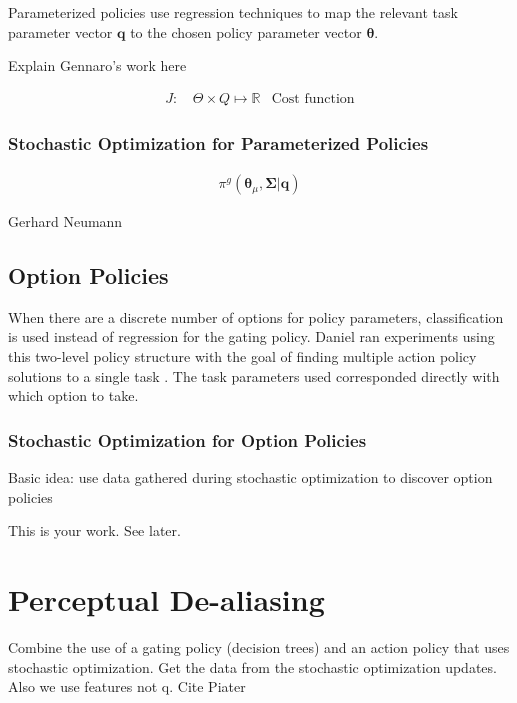 \documentclass[12pt]{article}
\newcommand{\polg}   {\ensuremath{\pi^g}}
\newcommand{\appsp}  {\ensuremath{\Theta}}
\newcommand{\taskp}  {\ensuremath{\mathbf{q}}}
\newcommand{\costf}  {\ensuremath{J}}
\newcommand{\app}    {\ensuremath{\bm{\theta}}}
\newcommand{\taskpsp}{\ensuremath{Q}}
\newcommand{\covar}  {\ensuremath{\bm{\Sigma}}}
\begin{document}
Parameterized policies use regression techniques to map the relevant task parameter vector $\taskp$ to the chosen policy parameter vector $\app$.

\color{red} Explain Gennaro's work here \color{black}

\begin{align}
\costf\mbox{: } &\label{eq:cost} \appsp \times \taskpsp \mapsto \mathbb{R}&\mbox{Cost function}
\end{align}

\subsubsection{Stochastic Optimization for Parameterized Policies}

\begin{align}
\label{eq:gating_par}\polg(\app_\mu,\covar|\taskp)
\end{align}

Gerhard Neumann



\subsection{Option Policies}

When there are a discrete number of options for policy parameters, classification is used instead of regression for the gating policy. Daniel ran experiments using this two-level policy structure with the goal of finding multiple action policy solutions to a single task \cite{daniel}. The task parameters used corresponded directly with which option to take. 

\subsubsection{Stochastic Optimization for Option Policies}

Basic idea: use data gathered during stochastic optimization to discover option policies

This is your work. See later.


\section{Perceptual De-aliasing}

\color{red}Combine the use of a gating policy (decision trees) and an action policy that uses stochastic optimization. Get the data from the stochastic optimization updates. Also we use features not q. Cite Piater\color{black}
\end{document}
